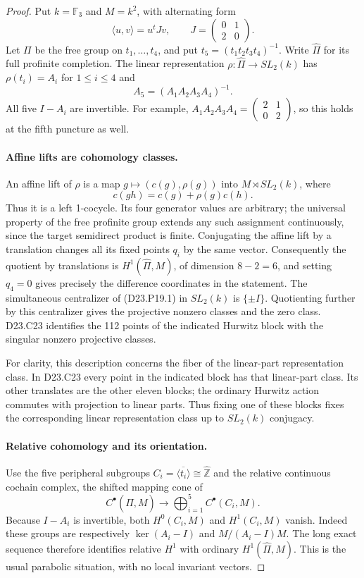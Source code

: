 \begin{proof}
Put $k=\mathbb F_3$ and $M=k^2$, with alternating form
\[
       \langle u,v\rangle=u^tJv,
       \qquad J=\begin{pmatrix}0&1\\2&0\end{pmatrix}.
\]
Let $\Pi$ be the free group on $t_1,\ldots,t_4$, and put
$t_5=(t_1t_2t_3t_4)^{-1}$. Write $\widehat\Pi$ for its full
profinite completion. The linear representation
$\rho:\widehat\Pi\to SL_2(k)$ has
$\rho(t_i)=A_i$ for $1\leq i\leq4$ and
\[
 A_5=(A_1A_2A_3A_4)^{-1}.
\]
All five $I-A_i$ are invertible. For example,
$A_1A_2A_3A_4=\left(\begin{smallmatrix}2&1\\0&2\end{smallmatrix}\right)$,
so this holds at the fifth puncture as well.

\paragraph{Affine lifts are cohomology classes.}
An affine lift of $\rho$ is a map
$g\mapsto(c(g),\rho(g))$ into $M\rtimes SL_2(k)$, where
\[
                 c(gh)=c(g)+\rho(g)c(h).                  \tag{D23.P19.4}
\]
Thus it is a left 1-cocycle. Its four generator values are
arbitrary; the universal property of the free profinite group
extends any such assignment continuously, since the target
semidirect product is finite. Conjugating the affine lift by
a translation changes all its fixed points $q_i$ by the same
vector. Consequently the quotient by translations is
$H^1(\widehat\Pi,M)$, of dimension $8-2=6$, and setting
$q_4=0$ gives precisely the difference coordinates in the
statement. The simultaneous centralizer of (D23.P19.1) in
$SL_2(k)$ is $\{\pm I\}$. Quotienting further by this
centralizer gives the projective nonzero classes and the zero
class. D23.C23 identifies the 112 points of the indicated
Hurwitz block with the singular nonzero projective classes.

For clarity, this description concerns the fiber of the
linear-part representation class. In D23.C23 every point in
the indicated block has that linear-part class. Its other
translates are the other eleven blocks; the ordinary Hurwitz
action commutes with projection to linear parts. Thus fixing
one of these blocks fixes the corresponding linear
representation class up to $SL_2(k)$ conjugacy.

\paragraph{Relative cohomology and its orientation.}
Use the five peripheral subgroups
$C_i=\overline{\langle t_i\rangle}\cong\widehat{\mathbb Z}$
and the relative continuous cochain complex, the shifted
mapping cone of
\[
 C^\bullet(\widehat\Pi,M)\longrightarrow
              \bigoplus_{i=1}^5 C^\bullet(C_i,M).
\]
Because $I-A_i$ is invertible, both
$H^0(C_i,M)$ and $H^1(C_i,M)$ vanish. Indeed these groups are
respectively $\ker(A_i-I)$ and $M/(A_i-I)M$. The long exact
sequence therefore identifies relative $H^1$ with ordinary
$H^1(\widehat\Pi,M)$. This is the usual parabolic situation,
with no local invariant vectors.


\end{proof}
